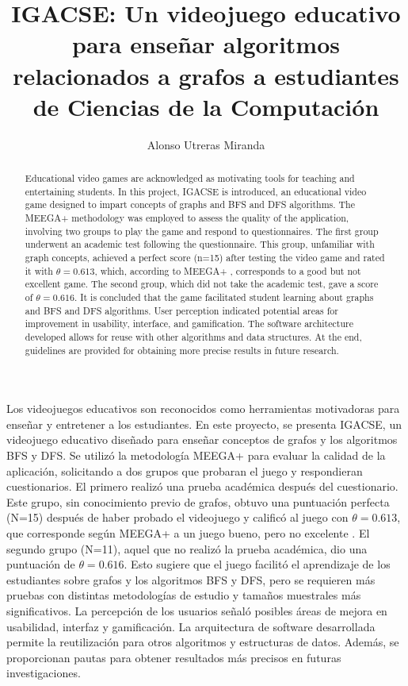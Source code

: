 \documentclass{umemoria}
\author{Alonso Utreras Miranda}
\title{IGACSE: Un videojuego educativo para enseñar algoritmos relacionados a grafos a estudiantes de Ciencias de la Computación}
\begin{document}
\frontmatter
\maketitle

\begin{resumen}

Los videojuegos educativos son reconocidos como herramientas motivadoras para enseñar y entretener a los estudiantes. En este proyecto, se presenta IGACSE, un videojuego educativo diseñado para enseñar conceptos de grafos y los algoritmos BFS y DFS. Se utilizó la metodología MEEGA+ \cite{meegaplus} para evaluar la calidad de la aplicación, solicitando a dos grupos que probaran el juego y respondieran cuestionarios. El primero realizó una prueba académica después del cuestionario. Este grupo, sin conocimiento previo de grafos, obtuvo una puntuación perfecta (N=15) después de haber probado el videojuego y calificó al juego con $\theta = 0.613$, que corresponde según MEEGA+ a un juego bueno, pero no excelente \cite{MeegaPlusManual}. El segundo grupo (N=11), aquel que no realizó la prueba académica, dio una puntuación de $\theta = 0.616$. Esto sugiere que el juego facilitó el aprendizaje de los estudiantes sobre grafos y los algoritmos BFS y DFS, pero se requieren más pruebas con distintas metodologías de estudio y tamaños muestrales más significativos. La percepción de los usuarios señaló posibles áreas de mejora en usabilidad, interfaz y gamificación. La arquitectura de software desarrollada permite la reutilización para otros algoritmos y estructuras de datos. Además, se proporcionan pautas para obtener resultados más precisos en futuras investigaciones.


\end{resumen}


\begin{abstract}

Educational video games are acknowledged as motivating tools for teaching and entertaining students. In this project, IGACSE is introduced, an educational video game designed to impart concepts of graphs and BFS and DFS algorithms. The MEEGA+ methodology \cite{meegaplus} was employed to assess the quality of the application, involving two groups to play the game and respond to questionnaires. The first group underwent an academic test following the questionnaire. This group, unfamiliar with graph concepts, achieved a perfect score (n=15) after testing the video game and rated it with $\theta = 0.613$, which, according to MEEGA+ \cite{MeegaPlusManual}, corresponds to a good but not excellent game. The second group, which did not take the academic test, gave a score of $\theta = 0.616$. It is concluded that the game facilitated student learning about graphs and BFS and DFS algorithms. User perception indicated potential areas for improvement in usability, interface, and gamification. The software architecture developed allows for reuse with other algorithms and data structures. At the end, guidelines are provided for obtaining more precise results in future research.

\end{abstract}
\end{document}
